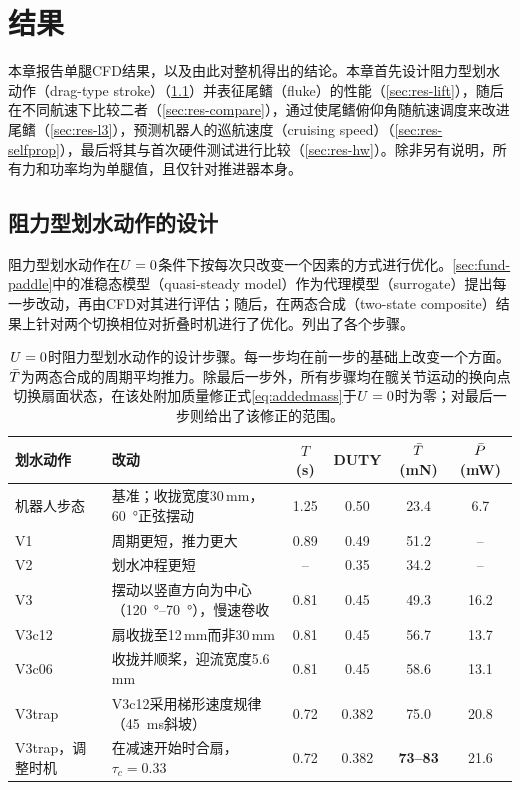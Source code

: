 \chapter{结果}
\label{ch:results}

本章报告单腿CFD结果，以及由此对整机得出的结论。本章首先设计阻力型划水动作（drag-type stroke）（\cref{sec:res-drag}）并表征尾鳍（fluke）的性能（\cref{sec:res-lift}），随后在不同航速下比较二者（\cref{sec:res-compare}），通过使尾鳍俯仰角随航速调度来改进尾鳍（\cref{sec:res-l3}），预测机器人的巡航速度（cruising speed）（\cref{sec:res-selfprop}），最后将其与首次硬件测试进行比较（\cref{sec:res-hw}）。除非另有说明，所有力和功率均为单腿值，且仅针对推进器本身。

\section{阻力型划水动作的设计}
\label{sec:res-drag}

阻力型划水动作在$U=0$条件下按每次只改变一个因素的方式进行优化。\cref{sec:fund-paddle}中的准稳态模型（quasi-steady model）作为代理模型（surrogate）提出每一步改动，再由CFD对其进行评估；随后，在两态合成（two-state composite）结果上针对两个切换相位对折叠时机进行了优化。列出了各个步骤。

\begin{table}[t]
  \centering
  \caption[阻力型划水动作的设计步骤]{$U=0$时阻力型划水动作的设计步骤。每一步均在前一步的基础上改变一个方面。$\bar{T}$为两态合成的周期平均推力。除最后一步外，所有步骤均在髋关节运动的换向点切换扇面状态，在该处附加质量修正式\eqref{eq:addedmass}于$U=0$时为零；对最后一步则给出了该修正的范围。}
  \label{tab:drag-design}
  \small
  \begin{tabularx}{\textwidth}{@{}l>{\raggedright\arraybackslash}Xcccc@{}}
    \toprule
    划水动作 & 改动 & $T$ (s) & DUTY & $\bar{T}$ (mN) & $\bar{P}$ (mW) \\
    \midrule
    机器人步态 & 基准；收拢宽度30\,mm，\SI{60}{\degree}正弦摆动 & 1.25 & 0.50 & 23.4 & 6.7 \\
    V1 & 周期更短，推力更大 & 0.89 & 0.49 & 51.2 & -- \\
    V2 & 划水冲程更短 & -- & 0.35 & 34.2 & -- \\
    V3 & 摆动以竖直方向为中心（\SIrange{120}{70}{\degree}），慢速卷收 & 0.81 & 0.45 & 49.3 & 16.2 \\
    V3c12 & 扇收拢至12\,mm而非30\,mm & 0.81 & 0.45 & 56.7 & 13.7 \\
    V3c06 & 收拢并顺桨，迎流宽度5.6\,mm & 0.81 & 0.45 & 58.6 & 13.1 \\
    V3trap & V3c12采用梯形速度规律（\SI{45}{\milli\second}斜坡） & 0.72 & 0.382 & 75.0 & 20.8 \\
    V3trap，调整时机 & 在减速开始时合扇，$\tau_c=0.33$ & 0.72 & 0.382 & \textbf{73--83} & 21.6 \\
    \bottomrule
  \end{tabularx}
\end{table}

